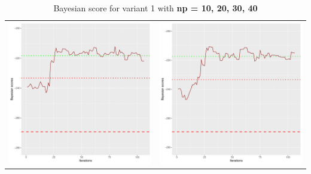 \documentclass[]{scrartcl}
\begin{document}
\begin{table}[h!]
\begin{tabular}{cc}
\includegraphics[scale = 0.4]{./figs/asia/v1/30/bayBoundsEvolution-107.pdf} & 
\includegraphics[scale = 0.4]{./figs/asia/v1/40/bayBoundsEvolution-107.pdf} \\
\end{tabular}
\caption{Bayesian score for variant 1 with \textbf{np =  10, 20, 30, 40}}
\end{table}
\end{document}
